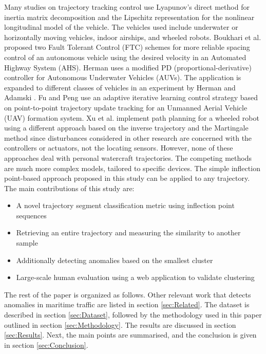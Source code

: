 \documentclass[preprint,12pt]{elsarticle}
\begin{document}
Many studies on trajectory tracking control use Lyapunov’s direct method for inertia matrix decomposition and the Lipschitz representation for the nonlinear longitudinal model of the vehicle. The vehicles used include underwater or horizontally moving vehicles, indoor airships, and wheeled robots. Boukhari et al. \cite{BOUKHARI2019236} proposed two Fault Tolerant Control (FTC) schemes for more reliable spacing control of an autonomous vehicle using the desired velocity in an Automated Highway System (AHS). Herman \cite{HERMAN20102317} uses a modified PD (proportional-derivative) controller for Autonomous Underwater Vehicles (AUVs). The application is expanded to different classes of vehicles in an experiment by Herman and Adamski \cite{HERMAN2020175}. Fu and Peng \cite{FU20231} use an adaptive iterative learning control strategy based on point-to-point trajectory update tracking for an Unmanned Aerial Vehicle (UAV) formation system. Xu et al. \cite{XU2022603} implement path planning for a wheeled robot using a different approach based on the inverse trajectory and the Martingale method since disturbances considered in other research are concerned with the controllers or actuators, not the locating sensors. However, none of these approaches deal with personal watercraft trajectories. The competing methods are much more complex models, tailored to specific devices. The simple inflection point-based approach proposed in this study can be applied to any trajectory. The main contributions of this study are:

\begin{itemize}
    \item A novel trajectory segment classification metric using inflection point sequences
    \item Retrieving an entire trajectory and measuring the similarity to another sample
    \item Additionally detecting anomalies based on the smallest cluster
    \item Large-scale human evaluation using a web application to validate clustering
\end{itemize}

The rest of the paper is organized as follows. Other relevant work that detects anomalies in maritime traffic are listed in section \ref{sec:Related}. The dataset is described in section \ref{sec:Dataset}, followed by the methodology used in this paper outlined in section \ref{sec:Methodology}. The results are discussed in section \ref{sec:Results}. Next, the main points are summarised, and the conclusion is given in section \ref{sec:Conclusion}.
\end{document}
